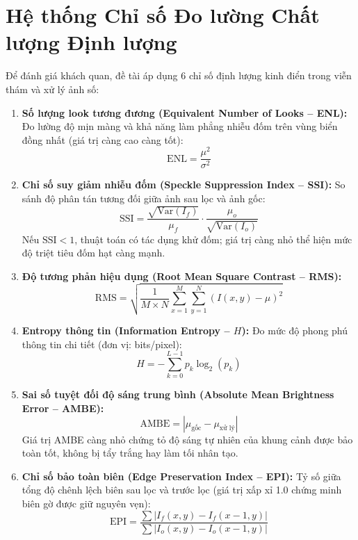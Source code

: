 \section{Hệ thống Chỉ số Đo lường Chất lượng Định lượng}
Để đánh giá khách quan, đề tài áp dụng 6 chỉ số định lượng kinh điển trong viễn thám và xử lý ảnh số:
\begin{enumerate}
    \item \textbf{Số lượng look tương đương (Equivalent Number of Looks -- ENL):} Đo lường độ mịn màng và khả năng làm phẳng nhiễu đốm trên vùng biển đồng nhất (giá trị càng cao càng tốt):
    \begin{equation}
    \text{ENL} = \frac{\mu^2}{\sigma^2}
    \label{eq:enl}
    \end{equation}
    \item \textbf{Chỉ số suy giảm nhiễu đốm (Speckle Suppression Index -- SSI):} So sánh độ phân tán tương đối giữa ảnh sau lọc và ảnh gốc:
    \begin{equation}
    \text{SSI} = \frac{\sqrt{\text{Var}(I_f)}}{\mu_f} \cdot \frac{\mu_o}{\sqrt{\text{Var}(I_o)}}
    \label{eq:ssi}
    \end{equation}
    Nếu $\text{SSI} < 1$, thuật toán có tác dụng khử đốm; giá trị càng nhỏ thể hiện mức độ triệt tiêu đốm hạt càng mạnh.
    \item \textbf{Độ tương phản hiệu dụng (Root Mean Square Contrast -- RMS):}
    \begin{equation}
    \text{RMS} = \sqrt{\frac{1}{M \times N} \sum_{x=1}^M \sum_{y=1}^N (I(x, y) - \mu)^2}
    \label{eq:rms}
    \end{equation}
    \item \textbf{Entropy thông tin (Information Entropy -- $H$):} Đo mức độ phong phú thông tin chi tiết (đơn vị: bits/pixel):
    \begin{equation}
    H = -\sum_{k=0}^{L-1} p_k \log_2(p_k)
    \label{eq:entropy}
    \end{equation}
    \item \textbf{Sai số tuyệt đối độ sáng trung bình (Absolute Mean Brightness Error -- AMBE):}
    \begin{equation}
    \text{AMBE} = |\mu_{\text{gốc}} - \mu_{\text{xử lý}}|
    \label{eq:ambe}
    \end{equation}
    Giá trị AMBE càng nhỏ chứng tỏ độ sáng tự nhiên của khung cảnh được bảo toàn tốt, không bị tẩy trắng hay làm tối nhân tạo.
    \item \textbf{Chỉ số bảo toàn biên (Edge Preservation Index -- EPI):} Tỷ số giữa tổng độ chênh lệch biên sau lọc và trước lọc (giá trị xấp xỉ 1.0 chứng minh biên gờ được giữ nguyên vẹn):
    \begin{equation}
    \text{EPI} = \frac{\sum |I_f(x, y) - I_f(x-1, y)|}{\sum |I_o(x, y) - I_o(x-1, y)|}
    \label{eq:epi}
    \end{equation}
\end{enumerate}



